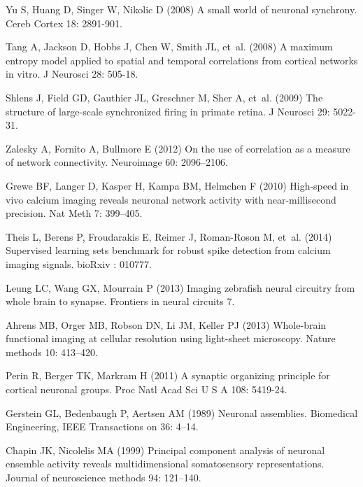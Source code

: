 \begin{thebibliography}{100}
Yu S, Huang D, Singer W, Nikolic D (2008) A small world of neuronal synchrony.
\newblock Cereb Cortex 18: 2891-901.

Tang A, Jackson D, Hobbs J, Chen W, Smith JL, et~al. (2008) A maximum entropy
  model applied to spatial and temporal correlations from cortical networks in
  vitro.
\newblock J Neurosci 28: 505-18.

Shlens J, Field GD, Gauthier JL, Greschner M, Sher A, et~al. (2009) The
  structure of large-scale synchronized firing in primate retina.
\newblock J Neurosci 29: 5022-31.

Zalesky A, Fornito A, Bullmore E (2012) On the use of correlation as a measure
  of network connectivity.
\newblock Neuroimage 60: 2096--2106.

Grewe BF, Langer D, Kasper H, Kampa BM, Helmchen F (2010) High-speed in vivo
  calcium imaging reveals neuronal network activity with near-millisecond
  precision.
\newblock Nat Meth 7: 399--405.

Theis L, Berens P, Froudarakis E, Reimer J, Roman-Roson M, et~al. (2014)
  Supervised learning sets benchmark for robust spike detection from calcium
  imaging signals.
\newblock bioRxiv : 010777.

Leung LC, Wang GX, Mourrain P (2013) Imaging zebrafish neural circuitry from
  whole brain to synapse.
\newblock Frontiers in neural circuits 7.

Ahrens MB, Orger MB, Robson DN, Li JM, Keller PJ (2013) Whole-brain functional
  imaging at cellular resolution using light-sheet microscopy.
\newblock Nature methods 10: 413--420.

Perin R, Berger TK, Markram H (2011) A synaptic organizing principle for
  cortical neuronal groups.
\newblock Proc Natl Acad Sci U S A 108: 5419-24.

Gerstein GL, Bedenbaugh P, Aertsen AM (1989) Neuronal assemblies.
\newblock Biomedical Engineering, IEEE Transactions on 36: 4--14.

Chapin JK, Nicolelis MA (1999) Principal component analysis of neuronal
  ensemble activity reveals multidimensional somatosensory representations.
\newblock Journal of neuroscience methods 94: 121--140.


\end{thebibliography}

